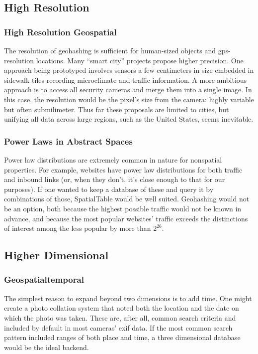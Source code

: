 \documentclass[11pt]{article}
\begin{document}
\subsection{High Resolution}

\subsubsection{High Resolution Geospatial}

The resolution of geohashing is sufficient for human-sized objects and gps-resolution locations.  Many ``smart city'' projects propose higher precision.  One approach being prototyped involves sensors a few centimeters in size embedded in sidewalk tiles recording microclimate and traffic information.\cite{nice}  A more ambitious approach is to access all security cameras and merge them into a single image.\cite{camera}  In this case, the resolution would be the pixel's size from the camera: highly variable but often submilimeter.  Thus far these proposals are limited to cities, but unifying all data across large regions, such as the United States, seems inevitable.

\subsubsection{Power Laws in Abstract Spaces}

Power law distributions are extremely common in nature for nonspatial properties.  For example, websites have power law distributions for both traffic and inbound links (or, when they don't, it's close enough to that for our purposes)\cite{powlaw}.  If one wanted to keep a database of these and query it by combinations of those, SpatialTable would be well suited.  Geohashing would not be an option, both because the highest possible traffic would not be known in advance, and because the most popular websites' traffic exceeds the distinctions of interest among the less popular by more than $2^{26}$.

\subsection{Higher Dimensional}

\subsubsection{Geospatialtemporal}

The simplest reason to expand beyond two dimensions is to add time.  One might create a photo collation system that noted both the location and the date on which the photo was taken.  These are, after all, common search criteria and included by default in most cameras' exif data.  If the most common search pattern included ranges of both place and time, a three dimensional database would be the ideal backend. 
\end{document}
